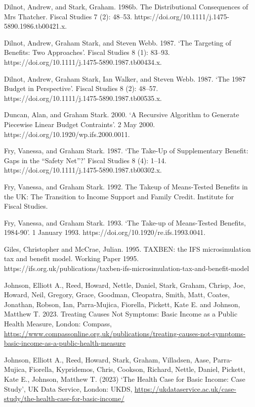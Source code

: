 \documentclass[
  letterpaper,
  DIV=11,
  numbers=noendperiod]{scrartcl}
\begin{document}
Dilnot, Andrew, and Stark, Graham. 1986b. The Distributional
Consequences of Mrs Thatcher. Fiscal Studies 7 (2): 48--53.
https://doi.org/10.1111/j.1475-5890.1986.tb00421.x.

Dilnot, Andrew, Graham Stark, and Steven Webb. 1987. `The Targeting of
Benefits: Two Approaches'. Fiscal Studies 8 (1): 83--93.
https://doi.org/10.1111/j.1475-5890.1987.tb00434.x.

Dilnot, Andrew, Graham Stark, Ian Walker, and Steven Webb. 1987. `The
1987 Budget in Perspective'. Fiscal Studies 8 (2): 48--57.
https://doi.org/10.1111/j.1475-5890.1987.tb00535.x.

Duncan, Alan, and Graham Stark. 2000. `A Recursive Algorithm to Generate
Piecewise Linear Budget Contraints'. 2 May 2000.
https://doi.org/10.1920/wp.ifs.2000.0011.

Fry, Vanessa, and Graham Stark. 1987. `The Take-Up of Supplementary
Benefit: Gaps in the ``Safety Net''?' Fiscal Studies 8 (4): 1--14.
https://doi.org/10.1111/j.1475-5890.1987.tb00302.x.

Fry, Vanessa, and Graham Stark. 1992. The Takeup of Means-Tested
Benefits in the UK: The Transition to Income Support and Family Credit.
Institute for Fiscal Studies.

Fry, Vanessa, and Graham Stark. 1993. `The Take-up of Means-Tested
Benefits, 1984-90'. 1 January 1993.
https://doi.org/10.1920/re.ifs.1993.0041.

Giles, Christopher and McCrae, Julian. 1995. TAXBEN: the IFS
microsimulation tax and benefit model. Working Paper 1995.
https://ifs.org.uk/publications/taxben-ifs-microsimulation-tax-and-benefit-model

Johnson, Elliott A., Reed, Howard, Nettle, Daniel, Stark, Graham,
Chrisp, Joe, Howard, Neil, Gregory, Grace, Goodman, Cleopatra, Smith,
Matt, Coates, Jonathan, Robson, Ian, Parra-Mujica, Fiorella, Pickett,
Kate E. and Johnson, Matthew T. 2023. Treating Causes Not Symptoms:
Basic Income as a Public Health Measure, London: Compass,
\url{https://www.compassonline.org.uk/publications/treating-causes-not-symptoms-basic-income-as-a-public-health-measure}

Johnson, Elliott A., Reed, Howard, Stark, Graham, Villadsen, Aase,
Parra-Mujica, Fiorella, Kypridemos, Chris, Cookson, Richard, Nettle,
Daniel, Pickett, Kate E., Johnson, Matthew T. (2023) `The Health Case
for Basic Income: Case Study', UK Data Service, London: UKDS,
\url{https://ukdataservice.ac.uk/case-study/the-health-case-for-basic-income/}
\end{document}
